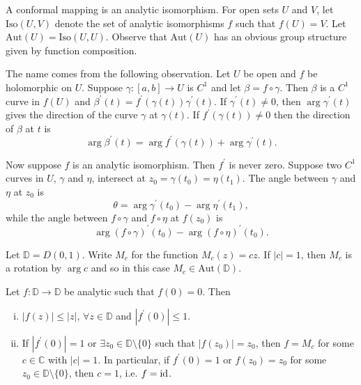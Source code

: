 \begin{defn}
A conformal mapping is an analytic isomorphism.
For open sets $U$ and $V$, let $\mathrm{Iso}(U, V)$ denote the
set of analytic isomorphisms $f$ such that $f(U) = V$. Let
$\mathrm{Aut}(U) = \mathrm{Iso}(U, U)$. Observe that
$\mathrm{Aut}(U)$ has an obvious group structure given by
function composition.
\end{defn}

The name comes from the following observation. Let $U$ be open
and $f$ be holomorphic on $U$. Suppose $\gamma : [a, b] \to U$
is $C^1$ and let $\beta = f \circ \gamma$. Then $\beta$ is a
$C^1$ curve in $f(U)$ and
$\beta^\prime(t) = f^\prime(\gamma(t)) \gamma^\prime(t)$. If
$\gamma^\prime(t) \neq 0$, then $\arg \gamma^\prime(t)$ gives the
direction of the curve $\gamma$ at $\gamma(t)$. If
$f^\prime(\gamma(t)) \neq 0$ then the direction of $\beta$ at
$t$ is
$$
  \arg \beta^\prime(t)
= \arg f^\prime(\gamma(t)) + \arg \gamma^\prime(t).
$$

Now suppose $f$ is an analytic isomorphism. Then $f^\prime$ is never
zero. Suppose two $C^1$ curves in $U$, $\gamma$ and $\eta$, intersect
at $z_0 = \gamma(t_0) = \eta(t_1)$. The angle between $\gamma$ and
$\eta$ at $z_0$ is
$$
  \theta
= \arg \gamma^\prime(t_0) - \arg \eta^\prime(t_1),
$$
while the angle between $f \circ \gamma$ and $f \circ \eta$ at
$f(z_0)$ is
$$
  \arg (f \circ \gamma)^\prime(t_0)
- \arg (f \circ \eta)^\prime(t_0).
$$

\begin{lemma}
Let $\mathbb{D} = D(0, 1)$. Write $M_c$ for the function
$M_c(z) = c z$. If $|c| = 1$, then $M_c$ is a rotation by
$\arg c$ and so in this case $M_c \in \mathrm{Aut}(\mathbb{D})$.

Let $f : \mathbb{D} \to \mathbb{D}$ be analytic such that $f(0) = 0$.
Then
\begin{enumerate}[(i)]
  \item{
    $|f(z)| \leq |z|$, $\forall z \in \mathbb{D}$ and $|f^\prime(0)| \leq 1$.
  }
  \item{
    If $|f^\prime(0)| = 1$ or
    $\exists z_0 \in \mathbb{D} \setminus \{ 0 \}$ such that
    $|f(z_0)| = z_0$, then $f = M_c$ for some $c \in \mathbb{C}$ with
    $|c| = 1$. In particular, if $f^\prime(0) = 1$ or $f(z_0) = z_0$
    for some $z_0 \in \mathbb{D} \setminus \{ 0 \}$, then $c = 1$,
    i.e. $f = \mathrm{id}$.
  }
\end{enumerate}
\end{lemma}


